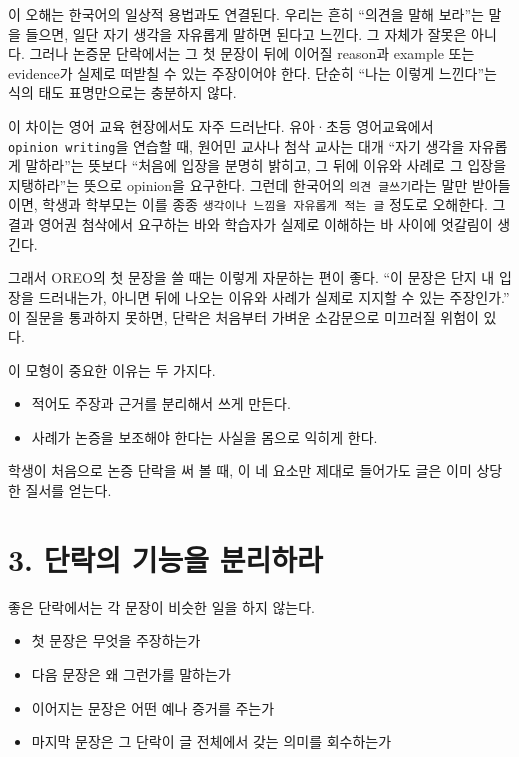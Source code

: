 이 오해는 한국어의 일상적 용법과도 연결된다. 우리는 흔히 ``의견을 말해 보라''는 말을 들으면, 일단 자기 생각을 자유롭게 말하면 된다고 느낀다. 그 자체가 잘못은 아니다. 그러나 논증문 단락에서는 그 첫 문장이 뒤에 이어질 reason과 example 또는 evidence가 실제로 떠받칠 수 있는 주장이어야 한다. 단순히 ``나는 이렇게 느낀다''는 식의 태도 표명만으로는 충분하지 않다.

이 차이는 영어 교육 현장에서도 자주 드러난다. 유아·초등 영어교육에서 \texttt{opinion\ writing}을 연습할 때, 원어민 교사나 첨삭 교사는 대개 ``자기 생각을 자유롭게 말하라''는 뜻보다 ``처음에 입장을 분명히 밝히고, 그 뒤에 이유와 사례로 그 입장을 지탱하라''는 뜻으로 opinion을 요구한다. 그런데 한국어의 \texttt{의견\ 글쓰기}라는 말만 받아들이면, 학생과 학부모는 이를 종종 \texttt{생각이나\ 느낌을\ 자유롭게\ 적는\ 글} 정도로 오해한다. 그 결과 영어권 첨삭에서 요구하는 바와 학습자가 실제로 이해하는 바 사이에 엇갈림이 생긴다.

그래서 OREO의 첫 문장을 쓸 때는 이렇게 자문하는 편이 좋다. ``이 문장은 단지 내 입장을 드러내는가, 아니면 뒤에 나오는 이유와 사례가 실제로 지지할 수 있는 주장인가.'' 이 질문을 통과하지 못하면, 단락은 처음부터 가벼운 소감문으로 미끄러질 위험이 있다.

이 모형이 중요한 이유는 두 가지다.

\begin{itemize}
\tightlist
\item
  적어도 주장과 근거를 분리해서 쓰게 만든다.
\item
  사례가 논증을 보조해야 한다는 사실을 몸으로 익히게 한다.
\end{itemize}

학생이 처음으로 논증 단락을 써 볼 때, 이 네 요소만 제대로 들어가도 글은 이미 상당한 질서를 얻는다.

\section{3. 단락의 기능을 분리하라}\label{3-uxb2e8uxb77duxc758-uxae30uxb2a5uxc744-uxbd84uxb9acuxd558uxb77c}

좋은 단락에서는 각 문장이 비슷한 일을 하지 않는다.

\begin{itemize}
\tightlist
\item
  첫 문장은 무엇을 주장하는가
\item
  다음 문장은 왜 그런가를 말하는가
\item
  이어지는 문장은 어떤 예나 증거를 주는가
\item
  마지막 문장은 그 단락이 글 전체에서 갖는 의미를 회수하는가
\end{itemize}

